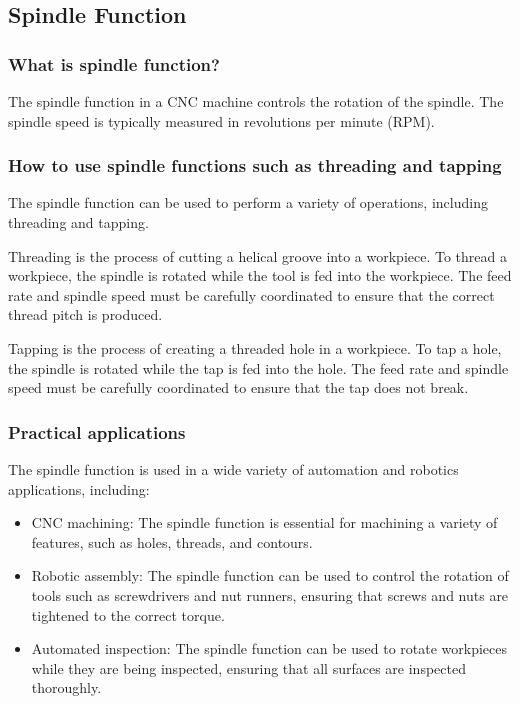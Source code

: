 \documentclass{article}
\begin{document}
\subsection*{Spindle Function}

\subsubsection*{What is spindle function?}
The spindle function in a CNC machine controls the rotation of the spindle. The spindle speed is typically measured in revolutions per minute (RPM).

\subsubsection*{How to use spindle functions such as threading and tapping}
The spindle function can be used to perform a variety of operations, including threading and tapping.

Threading is the process of cutting a helical groove into a workpiece. To thread a workpiece, the spindle is rotated while the tool is fed into the workpiece. The feed rate and spindle speed must be carefully coordinated to ensure that the correct thread pitch is produced.

Tapping is the process of creating a threaded hole in a workpiece. To tap a hole, the spindle is rotated while the tap is fed into the hole. The feed rate and spindle speed must be carefully coordinated to ensure that the tap does not break.

\subsubsection*{Practical applications}
The spindle function is used in a wide variety of automation and robotics applications, including:
\begin{itemize}
    \item CNC machining: The spindle function is essential for machining a variety of features, such as holes, threads, and contours.
    \item Robotic assembly: The spindle function can be used to control the rotation of tools such as screwdrivers and nut runners, ensuring that screws and nuts are tightened to the correct torque.
    \item Automated inspection: The spindle function can be used to rotate workpieces while they are being inspected, ensuring that all surfaces are inspected thoroughly.
\end{itemize}
\end{document}
